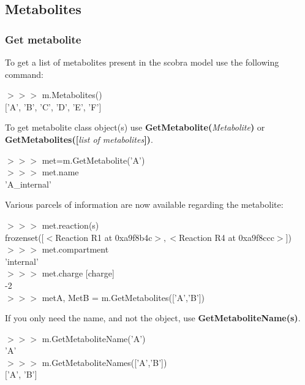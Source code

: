 
\subsection{Metabolites}

\subsubsection{Get metabolite}

To get a list of metabolites present in the scobra model use the following command:
\begin{framed}
$>>>$ m.Metabolites()\\
$[$'A', 'B', 'C', 'D', 'E', 'F'$]$
\end{framed}

To get metabolite class object(s) use \textbf{GetMetabolite(}\textit{Metabolite}\textbf{)} or \textbf{GetMetabolites([}\textit{list of metabolites}\textbf{])}.

\begin{framed}
$>>>$ met=m.GetMetabolite('A')\\
$>>>$ met.name\\
'A\_internal'
\end{framed}

Various parcels of information are now available regarding the metabolite:

\begin{framed}
$>>>$ met.reaction(s)\\
frozenset([$<$Reaction R1 at 0xa9f8b4c$>, <$Reaction R4 at 0xa9f8ccc$>$])\\

$>>>$ met.compartment\\
'internal'\\

$>>>$ met.charge [charge]\\
-2\\

$>>>$ metA, MetB = m.GetMetabolites(['A','B'])
\end{framed}

If you only need the name, and not the object, use \textbf{GetMetaboliteName(s)}.

\begin{framed}
$>>>$ m.GetMetaboliteName('A')\\
'A'\\

$>>>$ m.GetMetaboliteNames(['A','B'])\\
$[$'A', 'B'$]$
\end{framed}


